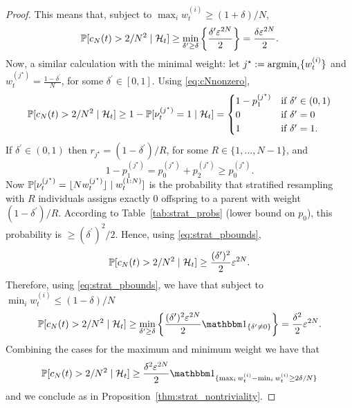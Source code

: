 \begin{proof}
This means that, subject to $\max_i w_t^{(i)} \geq (1+\delta)/N$,
\begin{equation*}
\Prob[ c_N(t) > 2/N^2 \mid \mathcal{H}_t ]
\geq \min_{\delta^\prime \geq \delta} 
        \left\{ \frac{\delta^\prime \varepsilon^{2N}}{2} \right\}
= \frac{ \delta \varepsilon^{2N} }{2} .
\end{equation*}
Now, a similar calculation with the minimal weight:
let $j^\star := \argmin_i \{ w_t^{(i)} \}$ and
$w_t^{(j^\star)} = \frac{1-\delta^\prime}{N}$, for some 
$\delta^\prime \in [0,1]$.
Using \eqref{eq:cNnonzero},
\begin{equation*}
\Prob[ c_N(t) > 2/N^2 \mid \mathcal{H}_t ]
\geq 1- \Prob[ \nu_t^{(j^\star)} =1 \mid \mathcal{H}_t ]
= \begin{cases}
    1 - p_1^{(j^\star)} & \text{if } \delta^\prime \in (0,1) \\
    0 & \text{if } \delta^\prime = 0 \\
    1 & \text{if } \delta^\prime = 1 .
\end{cases}
\end{equation*}
If $\delta^\prime \in (0,1)$ then $r_{j^\star} = (1- \delta^\prime)/R$, for some $R\in\{1, \dots, N-1\}$, and
\begin{equation*}
1 - p_1^{(j^\star)}
= p_0^{(j^\star)} + p_2^{(j^\star)}
\geq p_0^{(j^\star)} .
\end{equation*}
Now $\Prob[ \nu_t^{(j^\star)} = \flnw[j^\star] \mid w_t^{(1:N)} ]$ is the probability that stratified resampling with $R$ individuals assigns exactly 0 offspring to a parent with weight $(1-\delta^\prime) /R$. According to Table~\ref{tab:strat_probs} (lower bound on $p_0$), this probability is $\geq (\delta^\prime)^2 /2$.
Hence, using \eqref{eq:strat_pbounds}, 
\begin{equation*}
\Prob[ c_N(t) > 2/N^2 \mid \mathcal{H}_t ]
\geq \frac{(\delta^\prime)^2}{2} \varepsilon^{2N} .
\end{equation*}
Therefore, using \eqref{eq:strat_pbounds}, we have that subject to $\min_i w_t^{(i)} \leq (1-\delta)/N$
\begin{equation*}
\Prob[ c_N(t) > 2/N^2 \mid \mathcal{H}_t ]
\geq \min_{\delta^\prime \geq \delta} 
        \left\{ \frac{ (\delta^\prime)^2 \varepsilon^{2N} }{2} 
        \I{\delta^\prime \neq 0} \right\}
= \frac{\delta^2}{2} \varepsilon^{2N} .
\end{equation*}
Combining the cases for the maximum and minimum weight we have that
\begin{equation*}
\Prob[ c_N(t) > 2/N^2 \mid \mathcal{H}_t ] 
\geq \frac{ \delta^2 \varepsilon^{2N} }{2} 
        \I{ \max_i w_t^{(i)} - \min_i w_t^{(i)} \geq 2\delta/N }
\end{equation*}
and we conclude as in Proposition~\ref{thm:strat_nontriviality}.
\end{proof}




